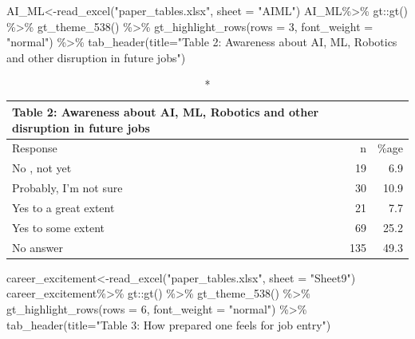 \documentclass[
  12pt]{article}
\newenvironment{Shaded}{\begin{snugshade}}{\end{snugshade}}
\newcommand{\AttributeTok}[1]{\textcolor[rgb]{0.40,0.45,0.13}{#1}}
\newcommand{\DecValTok}[1]{\textcolor[rgb]{0.68,0.00,0.00}{#1}}
\newcommand{\FunctionTok}[1]{\textcolor[rgb]{0.28,0.35,0.67}{#1}}
\newcommand{\NormalTok}[1]{\textcolor[rgb]{0.00,0.23,0.31}{#1}}
\newcommand{\OtherTok}[1]{\textcolor[rgb]{0.00,0.23,0.31}{#1}}
\newcommand{\SpecialCharTok}[1]{\textcolor[rgb]{0.37,0.37,0.37}{#1}}
\newcommand{\StringTok}[1]{\textcolor[rgb]{0.13,0.47,0.30}{#1}}
\begin{document}
\begin{Shaded}
\begin{Highlighting}[]
\NormalTok{AI\_ML}\OtherTok{\textless{}{-}}\FunctionTok{read\_excel}\NormalTok{(}\StringTok{"paper\_tables.xlsx"}\NormalTok{,   }\AttributeTok{sheet =} \StringTok{"AIML"}\NormalTok{)}
\NormalTok{AI\_ML}\SpecialCharTok{\%\textgreater{}\%}\NormalTok{ gt}\SpecialCharTok{::}\FunctionTok{gt}\NormalTok{() }\SpecialCharTok{\%\textgreater{}\%} 
  \FunctionTok{gt\_theme\_538}\NormalTok{() }\SpecialCharTok{\%\textgreater{}\%}
  \FunctionTok{gt\_highlight\_rows}\NormalTok{(}\AttributeTok{rows =} \DecValTok{3}\NormalTok{, }\AttributeTok{font\_weight =} \StringTok{"normal"}\NormalTok{) }\SpecialCharTok{\%\textgreater{}\%} 
  \FunctionTok{tab\_header}\NormalTok{(}\AttributeTok{title=}\StringTok{"Table 2: Awareness about AI, ML, Robotics and other disruption in future jobs"}\NormalTok{)}
\end{Highlighting}
\end{Shaded}

\captionsetup[table]{labelformat=empty,skip=1pt}
\begin{longtable}{lrr}
\caption*{
{\large Table 2: Awareness about AI, ML, Robotics and other disruption in future jobs}
} \\ 
\toprule
Response & n & \%age \\ 
\midrule
No , not yet & 19 & 6.9 \\ 
Probably, I'm not sure & 30 & 10.9 \\ 
Yes to a great extent & 21 & 7.7 \\ 
Yes to some extent & 69 & 25.2 \\ 
No answer & 135 & 49.3 \\ 
\bottomrule
\end{longtable}

\begin{Shaded}
\begin{Highlighting}[]
\NormalTok{career\_excitement}\OtherTok{\textless{}{-}}\FunctionTok{read\_excel}\NormalTok{(}\StringTok{"paper\_tables.xlsx"}\NormalTok{,   }\AttributeTok{sheet =} \StringTok{"Sheet9"}\NormalTok{)}
\NormalTok{career\_excitement}\SpecialCharTok{\%\textgreater{}\%}\NormalTok{ gt}\SpecialCharTok{::}\FunctionTok{gt}\NormalTok{() }\SpecialCharTok{\%\textgreater{}\%} 
  \FunctionTok{gt\_theme\_538}\NormalTok{() }\SpecialCharTok{\%\textgreater{}\%}
  \FunctionTok{gt\_highlight\_rows}\NormalTok{(}\AttributeTok{rows =} \DecValTok{6}\NormalTok{, }\AttributeTok{font\_weight =} \StringTok{"normal"}\NormalTok{) }\SpecialCharTok{\%\textgreater{}\%} 
  \FunctionTok{tab\_header}\NormalTok{(}\AttributeTok{title=}\StringTok{"Table 3: How prepared one feels for job entry"}\NormalTok{)}
\end{Highlighting}
\end{Shaded}
\end{document}
